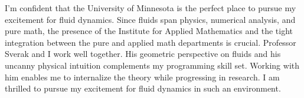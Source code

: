 \documentclass[12pt]{article}
\begin{document}
I'm confident that the University of Minnesota is the perfect place to pursue my excitement for fluid dynamics. Since fluids span physics, numerical analysis, and pure math, the presence of the Institute for Applied Mathematics and the tight integration between the pure and applied math departments is crucial. Professor Sverak and I work well together. His geometric perspective on fluids and his uncanny physical intuition complements my programming skill set. Working with him enables me to internalize the theory while progressing in research. I am thrilled to pursue my excitement for fluid dynamics in such an environment.
\end{document}
